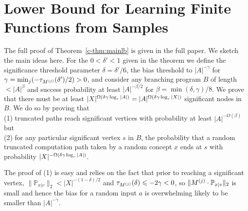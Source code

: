 \section{Lower Bound for Learning Finite Functions from Samples}

The full proof of Theorem~\ref{c-thm:mainlb} is given in the full paper.
We sketch the main ideas here.
For the  $0<\delta'<1$ given in the theorem
we define the significance threshold parameter
$\delta=\delta'/6$, the bias threshold to $|A|^{-\gamma}$ for
$\gamma=\min_j (-\tau_{M^{(j)}}(\delta')/2)>0$, and consider any branching program $B$
of length $<|A|^\beta$ and success probability at least $|A|^{-\beta/2}$ for
$\beta=\min(\delta,\gamma)/8$.
We prove that there must be at least
$|X|^{\Omega(\delta\gamma\log_r |A|)}=|A|^{\Omega(\delta\gamma\log_r |X|)}$
significant nodes in $B$.
We do so by proving that\\
(1) truncated paths reach significant vertices with
probability at least $|A|^{-O(\beta)}$
but\\
(2) for any particular significant vertex
$s$ in $B$, the probability that a random truncated computation path taken by a
random concept $x$ ends at $s$ with probability
$|X|^{-\Omega(\delta\gamma\log_r |A|)}$.

The proof of (1) is easy and relies on the fact that prior to reaching a
significant vertex, $\|\mathbb{P}_{x|v}\|_2<|X|^{-(1-\delta)/2}$ and 
$\tau_{M^{(j)}}(\delta)\leqslant -2\gamma<0$, so $\|M^{(j)}\cdot \mathbb{P}_{x|v}\|_2$ is
small and hence the bias for a random input $a$ is overwhelming likely to
be smaller than $|A|^{-\gamma}$.


